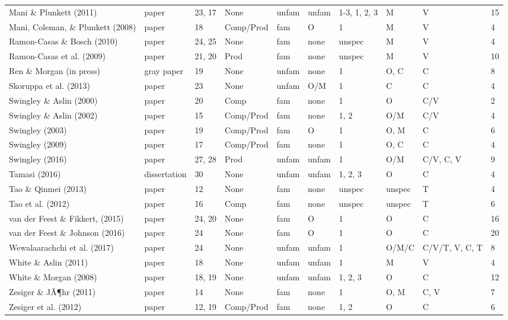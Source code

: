 \documentclass[man, noextraspace]{apa6}
\newenvironment{lltable}{\begin{landscape}\begin{center}\begin{ThreePartTable}}{\end{ThreePartTable}\end{center}\end{landscape}}
\begin{document}
\begin{lltable}
{\begin{longtable}{llllllllll}
Mani \& Plunkett (2011) & paper & 23, 17 & None & unfam & unfam & 1-3, 1, 2, 3 & M & V & 15\\
Mani, Coleman, \& Plunkett (2008) & paper & 18 & Comp/Prod & fam & O & 1 & M & V & 4\\
Ramon-Casas \& Bosch (2010) & paper & 24, 25 & None & fam & none & unspec & M & V & 4\\
Ramon-Casas et al. (2009) & paper & 21, 20 & Prod & fam & none & unspec & M & V & 10\\
Ren \& Morgan (in press) & gray paper & 19 & None & unfam & none & 1 & O, C & C & 8\\
Skoruppa et al. (2013) & paper & 23 & None & unfam & O/M & 1 & C & C & 4\\
Swingley \& Aslin (2000) & paper & 20 & Comp & fam & none & 1 & O & C/V & 2\\
Swingley \& Aslin (2002) & paper & 15 & Comp/Prod & fam & none & 1, 2 & O/M & C/V & 4\\
Swingley (2003) & paper & 19 & Comp/Prod & fam & O & 1 & O, M & C & 6\\
Swingley (2009) & paper & 17 & Comp/Prod & fam & none & 1 & O, C & C & 4\\
Swingley (2016) & paper & 27, 28 & Prod & unfam & unfam & 1 & O/M & C/V, C, V & 9\\
Tamasi (2016) & dissertation & 30 & None & unfam & unfam & 1, 2, 3 & O & C & 4\\
Tao \& Qinmei (2013) & paper & 12 & None & fam & none & unspec & unspec & T & 4\\
Tao et al. (2012) & paper & 16 & Comp & fam & none & unspec & unspec & T & 6\\
van der Feest \& Fikkert, (2015) & paper & 24, 20 & None & fam & O & 1 & O & C & 16\\
van der Feest \& Johnson (2016) & paper & 24 & None & fam & O & 1 & O & C & 20\\
Wewalaarachchi et al. (2017) & paper & 24 & None & unfam & unfam & 1 & O/M/C & C/V/T, V, C, T & 8\\
White \& Aslin (2011) & paper & 18 & None & unfam & unfam & 1 & M & V & 4\\
White \& Morgan (2008) & paper & 18, 19 & None & unfam & unfam & 1, 2, 3 & O & C & 12\\
Zesiger \& JÃ¶hr (2011) & paper & 14 & None & fam & none & 1 & O, M & C, V & 7\\
Zesiger et al. (2012) & paper & 12, 19 & Comp/Prod & fam & none & 1, 2 & O & C & 6\\
\bottomrule
\end{longtable}
}
\end{lltable}
\end{document}
